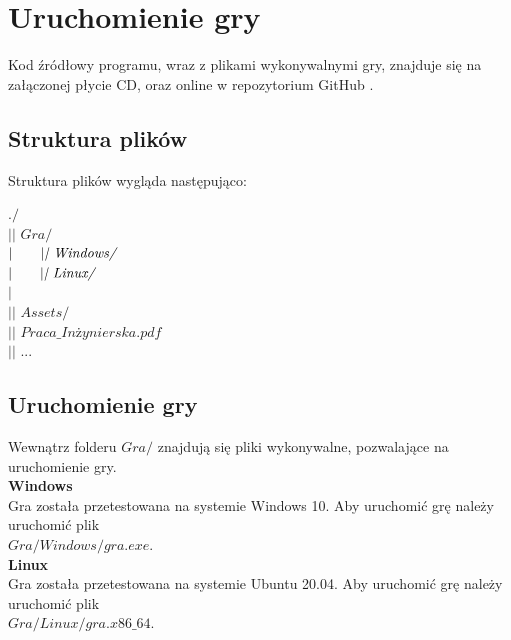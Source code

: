\chapter{Uruchomienie gry}
\thispagestyle{chapterBeginStyle}

Kod źródłowy programu, wraz z plikami wykonywalnymi gry, znajduje się na załączonej płycie CD, oraz online w repozytorium GitHub \cite{Github}.

\section{Struktura plików}
Struktura plików wygląda następująco:\\
\begin{algorithm}[H]
    $./$\\
    $|\textit{| Gra/}$\\
    $|\hskip2em |\textit{| Windows/}$\\
    $|\hskip2em |\textit{| Linux/}$\\
    $|$\\
    $|\textit{| Assets/}$\\
    $|\textit{| Praca\_Inżynierska.pdf}$\\
    $|\textit{| ...}$\\
\end{algorithm}

\section{Uruchomienie gry}
    Wewnątrz folderu $Gra/$ znajdują się pliki wykonywalne, pozwalające na uruchomienie gry.\\
    \textbf{Windows}\\
    Gra została przetestowana na systemie Windows 10. Aby uruchomić grę należy uruchomić plik\\
    $Gra/Windows/gra.exe$.\\
    \textbf{Linux}\\
    Gra została przetestowana na systemie Ubuntu 20.04. Aby uruchomić grę należy uruchomić plik\\
    $Gra/Linux/gra.x86\_64$.\\
\vspace{3cm}\\
